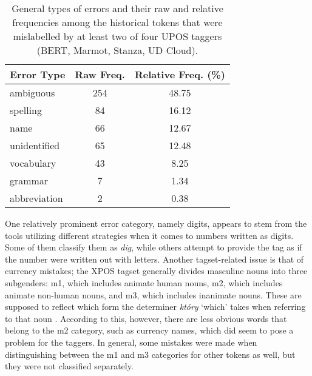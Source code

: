\renewcommand{\arraystretch}{1.25}
\begin{table}[H]
\begin{center}
\begin{tabular}{|l|cc|}
\hline \bf Error Type & \bf Raw Freq. & \bf Relative Freq. (\%) \\ \hline
ambiguous & 254 & 48.75 \\
spelling & 84 & 16.12 \\
name & 66 & 12.67 \\
unidentified & 65 & 12.48 \\
vocabulary & 43 & 8.25 \\
grammar & 7 & 1.34 \\
abbreviation & 2 & 0.38 \\
\hline
\end{tabular}
\caption{\label{table:general-xpos-errors} General types of errors and their raw and relative frequencies among the historical tokens that were mislabelled by at least two of four UPOS taggers (BERT, Marmot, Stanza, UD Cloud).}
\end{center}
\end{table}

One relatively prominent error category, namely digits, appears to stem from the tools utilizing different strategies when it comes to numbers written as digits. Some of them classify them as \textit{dig}, while others attempt to provide the tag as if the number were written out with letters. Another tagset-related issue is that of currency mistakes; the XPOS tagset generally divides masculine nouns into three subgenders: m1, which includes animate human nouns, m2, which includes animate non-human nouns, and m3, which includes inanimate nouns. These are supposed to reflect which form the determiner \textit{który} `which' takes when referring to that noun \citep{ud-masculine-gender}. According to this, however, there are less obvious words that belong to the m2 category, such as currency names, which did seem to pose a problem for the taggers. In general, some mistakes were made when distinguishing between the m1 and m3 categories for other tokens as well, but they were not classified separately.

